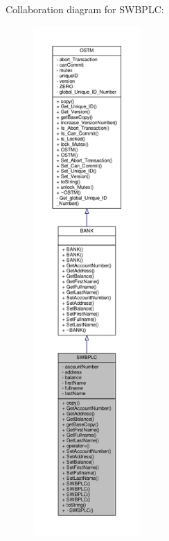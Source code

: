 Collaboration diagram for S\+W\+B\+P\+LC\+:\nopagebreak
\begin{figure}[H]
\begin{center}
\leavevmode
\includegraphics[height=550pt]{class_s_w_b_p_l_c__coll__graph}
\end{center}
\end{figure}
